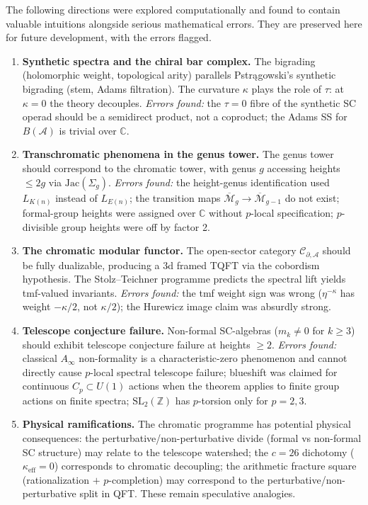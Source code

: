 \documentclass[11pt]{article}
\newcommand{\cA}{\mathcal{A}}
\newcommand{\cC}{\mathcal{C}}
\newcommand{\cM}{\mathcal{M}}
\newcommand{\C}{\mathbb{C}}
\newcommand{\Z}{\mathbb{Z}}
\begin{document}
The following directions were explored computationally and found to contain
valuable intuitions alongside serious mathematical errors.  They are
preserved here for future development, with the errors flagged.

\begin{enumerate}
\item \textbf{Synthetic spectra and the chiral bar complex.}
  The bigrading (holomorphic weight, topological arity) parallels
  Pstr\k{a}gowski's synthetic bigrading (stem, Adams filtration).
  The curvature $\kappa$ plays the role of $\tau$: at $\kappa = 0$ the
  theory decouples.  \emph{Errors found:} the $\tau = 0$ fibre of the
  synthetic SC operad should be a semidirect product, not a coproduct;
  the Adams SS for $B(\cA)$ is trivial over $\C$.

\item \textbf{Transchromatic phenomena in the genus tower.}
  The genus tower should correspond to the chromatic tower, with
  genus $g$ accessing heights $\le 2g$ via $\mathrm{Jac}(\Sigma_g)$.
  \emph{Errors found:} the height-genus identification used $L_{K(n)}$
  instead of $L_{E(n)}$; the transition maps
  $\overline{\cM}_g \to \overline{\cM}_{g-1}$ do not exist;
  formal-group heights were assigned over $\C$ without $p$-local
  specification; $p$-divisible group heights were off by factor 2.

\item \textbf{The chromatic modular functor.}
  The open-sector category $\cC_{\partial,\cA}$ should be fully
  dualizable, producing a 3d framed TQFT via the cobordism hypothesis.
  The Stolz--Teichner programme predicts the spectral lift yields
  tmf-valued invariants.  \emph{Errors found:} the tmf weight sign was
  wrong ($\eta^{-\kappa}$ has weight $-\kappa/2$, not $\kappa/2$); the
  Hurewicz image claim was absurdly strong.

\item \textbf{Telescope conjecture failure.}
  Non-formal SC-algebras ($m_k \ne 0$ for $k \ge 3$) should exhibit
  telescope conjecture failure at heights $\ge 2$.  \emph{Errors found:}
  classical $A_\infty$ non-formality is a characteristic-zero phenomenon
  and cannot directly cause $p$-local spectral telescope failure;
  blueshift was claimed for continuous $C_p \subset U(1)$ actions when
  the theorem applies to finite group actions on finite spectra;
  $\mathrm{SL}_2(\Z)$ has $p$-torsion only for $p = 2, 3$.

\item \textbf{Physical ramifications.}
  The chromatic programme has potential physical consequences:
  the perturbative/non-perturbative divide (formal vs non-formal SC
  structure) may relate to the telescope watershed; the
  $c = 26$ dichotomy ($\kappa_{\mathrm{eff}} = 0$) corresponds to
  chromatic decoupling; the arithmetic fracture square (rationalization
  $+$ $p$-completion) may correspond to the perturbative/non-perturbative
  split in QFT.  These remain speculative analogies.
\end{enumerate}
\end{document}
